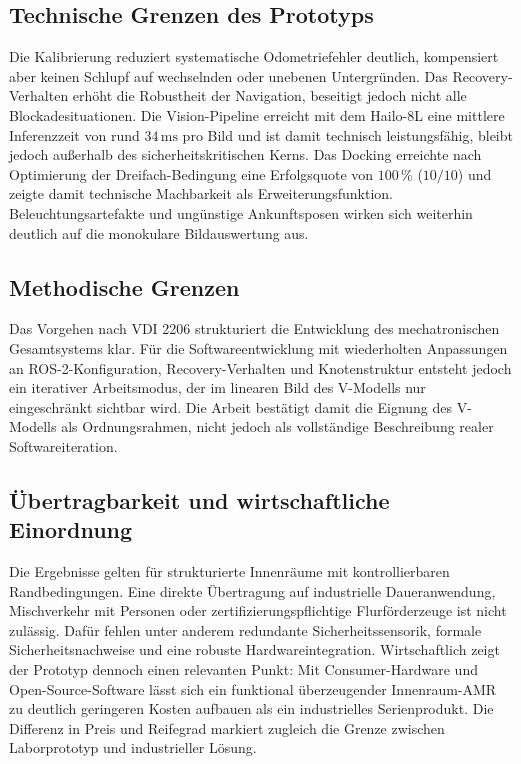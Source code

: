 \subsection{Technische Grenzen des Prototyps}

Die Kalibrierung reduziert systematische Odometriefehler deutlich, kompensiert aber keinen Schlupf auf wechselnden oder unebenen Untergründen. Das Recovery-Verhalten erhöht die Robustheit der Navigation, beseitigt jedoch nicht alle Blockadesituationen. Die Vision-Pipeline erreicht mit dem Hailo-8L eine mittlere Inferenzzeit von rund $34\,\mathrm{ms}$ pro Bild und ist damit technisch leistungsfähig, bleibt jedoch außerhalb des sicherheitskritischen Kerns. Das Docking erreichte nach Optimierung der Dreifach-Bedingung eine Erfolgsquote von $100\,\%$ ($10/10$) und zeigte damit technische Machbarkeit als Erweiterungsfunktion. Beleuchtungsartefakte und ungünstige Ankunftsposen wirken sich weiterhin deutlich auf die monokulare Bildauswertung aus.

\subsection{Methodische Grenzen}

Das Vorgehen nach VDI 2206 strukturiert die Entwicklung des mechatronischen Gesamtsystems klar. Für die Softwareentwicklung mit wiederholten Anpassungen an ROS-2-Konfiguration, Recovery-Verhalten und Knotenstruktur entsteht jedoch ein iterativer Arbeitsmodus, der im linearen Bild des V-Modells nur eingeschränkt sichtbar wird. Die Arbeit bestätigt damit die Eignung des V-Modells als Ordnungsrahmen, nicht jedoch als vollständige Beschreibung realer Softwareiteration.

\subsection{Übertragbarkeit und wirtschaftliche Einordnung}

Die Ergebnisse gelten für strukturierte Innenräume mit kontrollierbaren Randbedingungen. Eine direkte Übertragung auf industrielle Daueranwendung, Mischverkehr mit Personen oder zertifizierungspflichtige Flurförderzeuge ist nicht zulässig. Dafür fehlen unter anderem redundante Sicherheitssensorik, formale Sicherheitsnachweise und eine robuste Hardwareintegration. Wirtschaftlich zeigt der Prototyp dennoch einen relevanten Punkt: Mit Consumer-Hardware und Open-Source-Software lässt sich ein funktional überzeugender Innenraum-AMR zu deutlich geringeren Kosten aufbauen als ein industrielles Serienprodukt. Die Differenz in Preis und Reifegrad markiert zugleich die Grenze zwischen Laborprototyp und industrieller Lösung.

